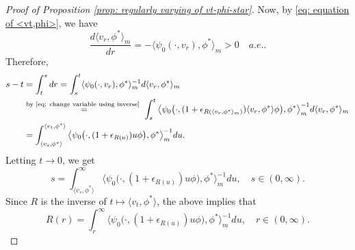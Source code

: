 \documentclass[12pt, a4paper]{amsart}
\theoremstyle{definition}
\numberwithin{equation}{section}
\begin{document}
\begin{proof}[Proof of Proposition \ref{prop: regularly varying of vt-phi-star}]
	Now, by \eqref{eq: equation of <vt,phi>}, we have
\begin{equation}
	\frac{d \langle v_r, \phi^* \rangle_m}{dr}
	= - \langle \psi_0(\cdot ,v_r) ,\phi^*\rangle_m
	> 0
	\quad a.e..
\end{equation}
	Therefore,
\begin{equation}\begin{split}
	s-t
	& = \int_t^s dr
	= \int_s^t \langle \psi_0(\cdot ,v_r), \phi^*\rangle _m^{-1} d\langle v_r ,\phi^* \rangle_m
	\\&\overset{\text{by \eqref{eq: change variable using inverse} }}{=} \int_s^t \big\langle \psi_0\big( \cdot ,(1+ \epsilon_{R(\langle v_r,\phi^* \rangle_m)})\langle v_r,\phi^*\rangle \phi \big), \phi^* \big\rangle _m^{-1} d\langle v_r ,\phi^* \rangle_m
	\\&= \int_{\langle v_s,\phi^*\rangle}^{\langle v_t, \phi^* \rangle} \big\langle \psi_0 \big( \cdot ,( 1 + \epsilon_{R(u)} ) u \phi \big), \phi^* \big\rangle_m^{-1} du.
\end{split}\end{equation}
	Letting $t\to 0$, we get
\begin{equation}
	s
	= \int_{\langle v_s,\phi^*\rangle}^\infty \big\langle \psi_0 \big(\cdot ,( 1 + \epsilon_{R(u)} ) u \phi \big), \phi^* \big\rangle_m^{-1} du,
	\quad s\in (0,\infty).
\end{equation}
	Since $R$ is the inverse of $t\mapsto \langle v_t,\phi^*\rangle$, the above implies that
\begin{equation}\label{eq: integral equation for R}
	R(r)
	= \int_r^\infty \big\langle \psi_0 \big(\cdot ,( 1 + \epsilon_{R(u)} ) u \phi \big), \phi^* \big\rangle_m^{-1} du,
	\quad r\in (0,\infty).
\end{equation}
	

\end{proof}
\end{document}
